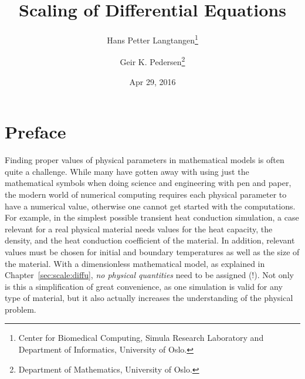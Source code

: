 \documentclass[graybox,envcountchap,sectrefs,final]{svmonodo}
\begin{document}

\newcommand{\exercisesection}[1]{\subsection*{#1}}







\frontmatter
\setcounter{page}{3}
\pagestyle{headings}



\title{Scaling of Differential Equations}


\author{Hans Petter Langtangen\footnote{Center for Biomedical Computing, Simula Research Laboratory and Department of Informatics, University of Oslo.}
\and Geir K. Pedersen\footnote{Department of Mathematics, University of Oslo.}}


\date{Apr 29, 2016}
\maketitle


\chapter*{Preface}
\label{ch:preface}

Finding proper values of physical parameters in mathematical models is
often quite a challenge. While many have gotten away with using just
the mathematical symbols when doing science and engineering with pen
and paper, the modern world of numerical computing requires each
physical parameter to have a numerical value, otherwise one cannot get
started with the computations.  For example, in the simplest possible
transient heat conduction simulation, a case relevant for a real
physical material needs values for the heat capacity, the density, and
the heat conduction coefficient of the material. In addition, relevant
values must be chosen for initial and boundary temperatures as well as
the size of the material.  With a dimensionless mathematical model, as
explained in Chapter~\ref{sec:scale:diffu}, \emph{no physical quantities}
need to be assigned (!). Not only is this a simplification of great
convenience, as one simulation is valid for any type of material, but
it also actually increases the understanding of the physical problem.
\end{document}
